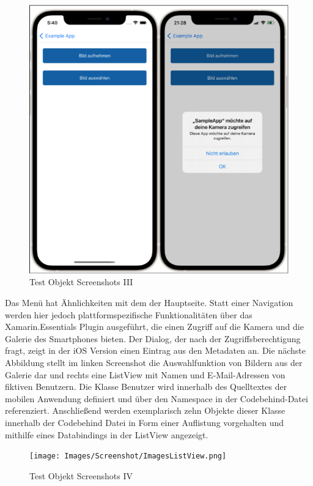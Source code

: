  
\begin{figure}[!ht]
 \includegraphics[width=\textwidth,keepaspectratio]{Images/Screenshot/Permissions.png}
 \caption{Test Objekt Screenshots III}
 \label{fig:TestObjectIII}
\end{figure}
Das Menü hat Ähnlichkeiten mit dem der Hauptseite.  Statt einer Navigation werden hier jedoch plattformspezifische Funktionalitäten über das Xamarin.Essentials Plugin ausgeführt, die einen Zugriff auf die Kamera und die Galerie des Smartphones bieten.  Der Dialog,  der nach der Zugriffsberechtigung fragt, zeigt in der iOS Version einen Eintrag aus den Metadaten an.
Die nächste Abbildung stellt im linken Screenshot die Auswahlfunktion von Bildern aus der Galerie dar und rechts eine ListView mit Namen und E-Mail-Adressen von fiktiven Benutzern.  
Die Klasse \glq Benutzer\grq{} wird innerhalb des Quelltextes der mobilen Anwendung definiert und über den Namespace in der Codebehind-Datei referenziert.  Anschließend werden exemplarisch zehn Objekte dieser Klasse innerhalb der Codebehind Datei  in Form einer Auflistung vorgehalten und mithilfe eines Databindings in der ListView angezeigt. 
 
\begin{figure}[!ht]
 \texttt{[image: Images/Screenshot/ImagesListView.png]}
 \caption{Test Objekt Screenshots IV}
 \label{fig:TestObjectIV}
\end{figure}


